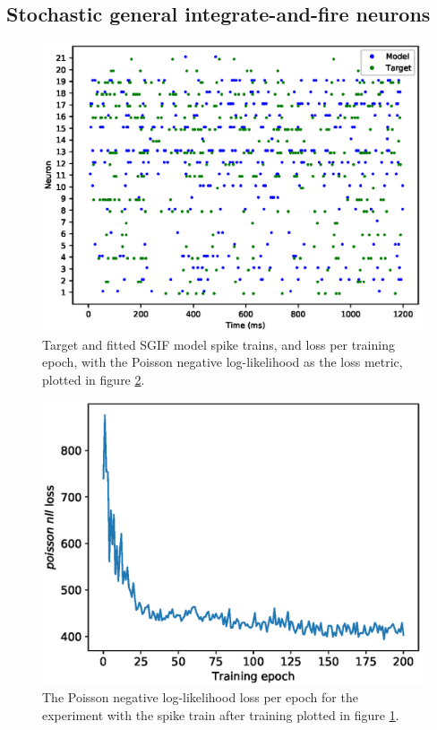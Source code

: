 \documentclass[mphil,deptreport,ianc]{infthesis} %
\begin{document}
\subsection{Stochastic general integrate-and-fire neurons}

\begin{figure}
    \centering
    \includegraphics[width=\columnwidth]{figures/samples/SameModelClassTarget/poisson/12-09_17-56-51-235/export_spike_trains_euid_12-09_17-56-51-235.eps}
    \caption{Target and fitted SGIF model spike trains, and loss per training epoch, with the Poisson negative log-likelihood as the loss metric, plotted in figure \ref{fig:PNLL_SGIF_sample_loss}.}
    \label{fig:sample_SGIF_plots}
\end{figure}

\begin{figure}
    \centering
    \includegraphics[width=0.5\columnwidth]{figures/samples/SameModelClassTarget/poisson/12-09_17-56-51-235/export_microGIF_plot_loss_euid_12-09_17-56-51-235.eps}
    \caption{The Poisson negative log-likelihood loss per epoch for the experiment with the spike train after training plotted in figure \ref{fig:sample_SGIF_plots}.}
    \label{fig:PNLL_SGIF_sample_loss}
\end{figure}
\end{document}
